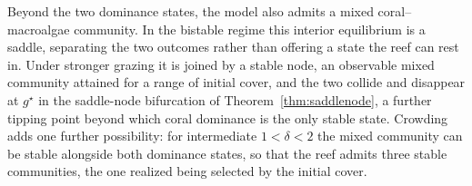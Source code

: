 \documentclass[reqno,11pt]{amsart}
\numberwithin{equation}{section}
\begin{document}
Beyond the two dominance states, the model also admits a mixed coral--macroalgae community. In the bistable regime this interior equilibrium is a saddle, separating the two outcomes rather than offering a state the reef can rest in. Under stronger grazing it is joined by a stable node, an observable mixed community attained for a range of initial cover, and the two collide and disappear at $g^\star$ in the saddle-node bifurcation of Theorem~\ref{thm:saddlenode}, a further tipping point beyond which coral dominance is the only stable state. Crowding adds one further possibility: for intermediate $1<\delta<2$ the mixed community can be stable alongside both dominance states, so that the reef admits three stable communities, the one realized being selected by the initial cover.

\bigskip
\end{document}
